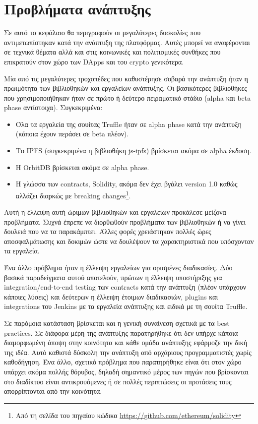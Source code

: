 \section{Προβλήματα ανάπτυξης} \label{section:4-4-problems-faced}

Σε αυτό το κεφάλαιο θα περιγραφούν οι μεγαλύτερες δυσκολίες που αντιμετωπίστηκαν κατά την ανάπτυξη της πλατφόρμας. Αυτές μπορεί να αναφέρονται σε τεχνικά θέματα αλλά και στις κοινωνικές και πολιτισμικές συνθήκες που επικρατούν στον χώρο των DApps και του crypto γενικότερα.

Μία από τις μεγαλύτερες τροχοπέδες που καθυστέρησε σοβαρά την ανάπτυξη ήταν η πρωιμότητα των βιβλιοθηκών και εργαλείων ανάπτυξης. Οι βασικότερες βιβλιοθήκες που χρησιμοποιήθηκαν ήταν σε πρώτο ή δεύτερο πειραματικό στάδιο (alpha και beta phase αντίστοιχα). Συγκεκριμένα:

\begin{itemize}
	\item Όλα τα εργαλεία της σουίτας Truffle ήταν σε alpha phase κατά την ανάπτυξη (κάποια έχουν περάσει σε beta πλέον).
	\item Το IPFS (συγκεκριμένα η βιβλιοθήκη js-ipfs) βρίσκεται ακόμα σε alpha έκδοση.
	\item Η OrbitDB βρίσκεται ακόμα σε alpha phase.
	\item Η γλώσσα των contracts, Solidity, ακόμα δεν έχει βγάλει version 1.0 καθώς αλλάζει διαρκώς με breaking changes\footnote{Από τη σελίδα του πηγαίου κώδικα \url{https://github.com/ethereum/solidity}}.
\end{itemize}

Αυτή η έλλειψη αυτή ώριμων βιβλιοθηκών και εργαλείων προκάλεσε μείζονα προβλήματα. Συχνά έπρεπε να διορθωθούν προβλήματα των βιβλιοθηκών ή να γίνει δουλειά που να τα παρακάμπτει. Άλλες φορές χρειάστηκαν πολλές ώρες αποσφαλμάτωσης και δοκιμών ώστε να δουλέψουν τα χαρακτηριστικά που υπόσχονταν τα εργαλεία.

Ένα άλλο πρόβλημα ήταν η έλλειψη εργαλείων για ορισμένες διαδικασίες. Δύο βασικά παραδείγματα αυτού αποτελούν, πρώτων η έλλειψη υποστήριξης για integration/end-to-end testing των contracts κατά την ανάπτυξη (πλέον υπάρχουν κάποιες λύσεις) και δεύτερων η έλλειψη έτοιμων διαδικασιών, plugins και integrations του Jenkins με τα εργαλεία ανάπτυξης και ειδικά με τη σουίτα Truffle.

Σε παρόμοια κατάσταση βρίσκεται και η γενική συναίνεση σχετικά με τα best practices. Σε διάφορα μέρη της ανάπτυξης παρατηρήθηκε ότι δεν υπήρχε κάποια διαμορφωμένη άποψη στην κοινότητα και κάθε ομάδα ανάπτυξης εφάρμοζε την δική της ιδέα. Αυτό καθιστά δύσκολη την ανάπτυξη από αρχάριους προγραμματιστές χωρίς καθοδήγηση. Ένα άλλο, σχετικό πρόβλημα που παρατηρήθηκε είναι ότι στον χώρο υπάρχει ακόμα πολλής θόρυβος, δηλαδή σημαντικό μέρος των πηγών που βρίσκονται στο διαδίκτυο είναι αντικρουόμενες ή σε πολλές περιπτώσεις οι προτάσεις τους απορρίπτονται από την κοινότητα.

